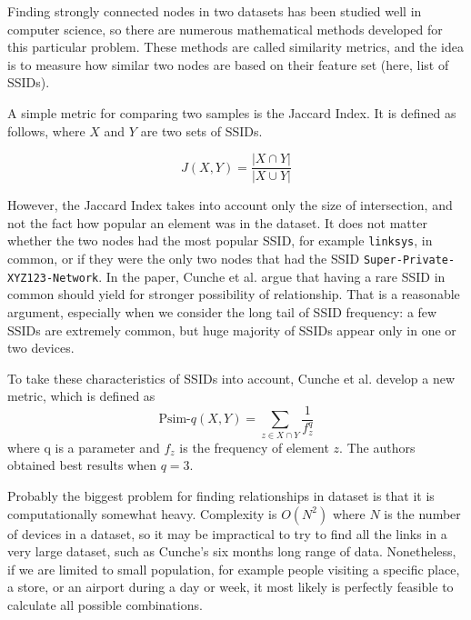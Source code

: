 \documentclass[12pt,a4paper,oneside,pdftex]{report}
\begin{document}
Finding strongly connected nodes in two datasets has been studied well in computer science, so there are numerous mathematical methods developed for this particular problem. These methods are called similarity metrics, and the idea is to measure how similar two nodes are based on their feature set (here, list of SSIDs). 

A simple metric for comparing two samples is the Jaccard Index. It is defined as follows, where $X$ and $Y$ are two sets of SSIDs.

$$J(X,Y) = \frac{\left| X \cap Y \right| }{\left| X \cup Y \right| } $$

However, the Jaccard Index takes into account only the size of intersection, and not the fact how popular an element was in the dataset. It does not matter whether the two nodes had the most popular SSID, for example \texttt{linksys}, in common, or if they were the only two nodes that had the SSID \texttt{Super-Private-XYZ123-Network}. In the paper, Cunche et al. argue that having a rare SSID in common should yield for stronger possibility of relationship. That is a reasonable argument, especially when we consider the long tail of SSID frequency: a few SSIDs are extremely common, but huge majority of SSIDs appear only in one or two devices.

To take these characteristics of SSIDs into account, Cunche et al. develop a new metric, which is defined as 
$$\text{Psim-}q(X,Y) = \sum_{z \in X \cap Y} \frac{1}{f_z^q}$$
where q is a parameter and $f_z$ is the frequency of element $z$. The authors obtained best results when $q=3$.~\cite{cunche2014linking}

Probably the biggest problem for finding relationships in dataset is that it is computationally somewhat heavy. Complexity is $O(N^2)$ where $N$ is the number of devices in a dataset, so it may be impractical to try to find all the links in a very large dataset, such as Cunche's six months long range of data. Nonetheless, if we are limited to small population, for example people visiting a specific place, a store, or an airport during a day or week, it most likely is perfectly feasible to calculate all possible combinations.

\end{document}

